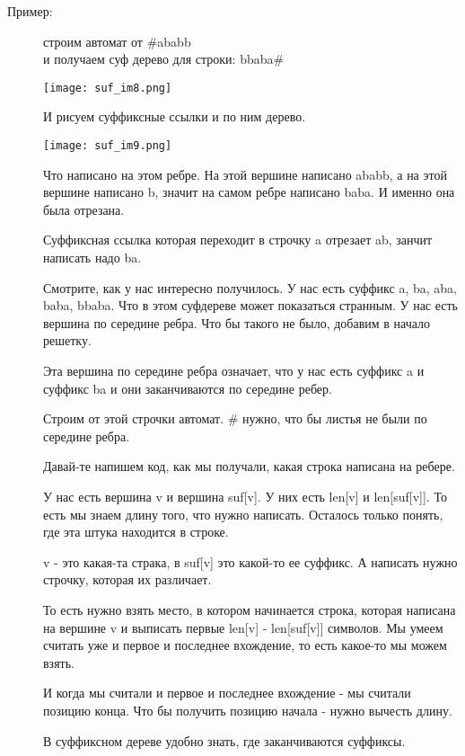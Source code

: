    \begin{description}
    \item[Пример:]

    строим автомат от \#ababb\\ 
    и получаем суф дерево для строки: bbaba\#

    \texttt{[image: suf\_im8.png]}


    И рисуем суффиксные ссылки и
    по ним дерево.

    \texttt{[image: suf\_im9.png]}

    Что написано на этом ребре. На этой вершине написано 
    ababb, а на этой вершине написано b, значит на 
    самом ребре написано baba. И именно она была отрезана.

    Суффиксная ссылка которая переходит в строчку a отрезает ab,
    занчит написать надо ba.

    Смотрите, как у нас интересно получилось.
    У нас есть суффикс a, ba, aba, baba, bbaba.
    Что в этом суфдереве может показаться странным. У нас
    есть вершина по середине ребра. Что бы такого
    не было, добавим в начало решетку.  

    Эта вершина по середине ребра означает, что у нас 
    есть суффикс a и суффикс ba  и они заканчиваются по середине ребер. 

    Строим от этой строчки автомат. 
    $\#$ нужно, что бы листья не были по 
    середине ребра. 

    Давай-те напишем код, как
    мы получали, какая строка написана на ребере. 

    У нас есть вершина v и вершина suf[v].  У них 
    есть len[v] и len[suf[v]]. То есть 
    мы знаем длину того, что нужно 
    написать. Осталось только понять, 
    где эта штука находится в строке.

    v - это какая-та страка, в suf[v] это 
    какой-то ее суффикс. А написать
    нужно строчку, которая их различает.

    То есть нужно взять место, в котором начинается 
    строка, которая написана на вершине v и выписать 
    первые len[v] - len[suf[v]] символов. Мы
    умеем считать уже и первое и последнее вхождение, то
    есть какое-то мы можем взять.

    И когда мы считали и первое и последнее вхождение - мы
    считали позицию конца. Что бы получить позицию
    начала - нужно вычесть длину.   

    В суффиксном дереве удобно знать, где заканчиваются суффиксы. 
    

\end{description}
